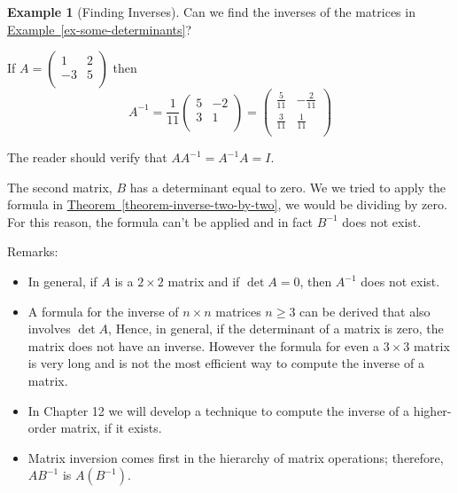 \documentclass[10pt,]{book}
\theoremstyle{plain}
\theoremstyle{definition}
\theoremstyle{definition}
\theoremstyle{definition}
\newtheorem{example}[theorem]{Example}
\theoremstyle{definition}
\begin{document}
\begin{example}[Finding Inverses]\label{ex-finding-inverses}
Can we find the inverses of the matrices in \hyperref[ex-some-determinants]{Example~\ref{ex-some-determinants}}? 

If \(A =\left(
\begin{array}{cc}
 1 & 2 \\
 -3 & 5 \\
\end{array}
\right)\)  then 
\begin{equation*}A^{-1}= \frac{1}{11}\left(
\begin{array}{cc}
 5 & -2 \\
 3 & 1 \\
\end{array}
\right)=\left(
\begin{array}{cc}
 \frac{5}{11} & -\frac{2}{11} \\
 \frac{3}{11} & \frac{1}{11} \\
\end{array}
\right)\end{equation*}

The reader should verify that \(A A^{-1}=A^{-1}A = I\).%
\par
The second matrix, \(B\) has a determinant equal to zero. We we tried to apply the formula in \hyperref[theorem-inverse-two-by-two]{Theorem~\ref{theorem-inverse-two-by-two}}, we would be dividing by zero.
For this reason, the formula can't be applied and in fact \(B^{-1}\) does not exist. 
%
\end{example}
\par
Remarks:%
\par
\leavevmode%
\begin{itemize}[label=\textbullet]
\item{} In general, if \(A\) is a \(2\times 2\) matrix and if \(\det  A = 0\), then \(A^{-1}\) does not exist.%
\item{} A formula for the inverse of \(n\times n\) matrices \(n\geq  3\) can be derived that also involves \(\det  A\), Hence, in general, if the determinant of a matrix is zero, the matrix does not have an inverse. However the formula for even a \(3 \times  3\) matrix is very long and is not the most efficient way to compute the inverse of a matrix.%
\item{} In Chapter 12 we will develop a technique to compute the inverse of a higher-order matrix, if it exists.%
\item{} Matrix inversion comes first in the hierarchy of matrix operations; therefore, \(A B^{-1}\) is \(A (B^{-1})\).%
\end{itemize}
%
\typeout{************************************************}
\typeout{************************************************}
\end{document}
